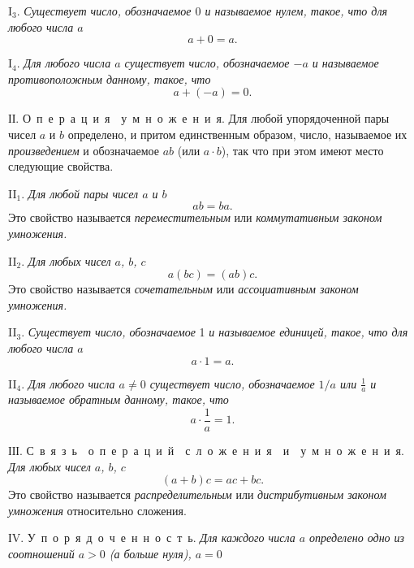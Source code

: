 \documentclass{book}
\begin{document}
\renewcommand{\headrulewidth}{0pt}
{\fontsize{15,8pt}{18pt}\selectfont
I$_{3}$. \textit{Существует число, обозначаемое $0$ и называемое нулем,
такое, что для любого числа $a$}
$$
a + 0 = a.
$$}

{\fontsize{15,8pt}{18pt}\selectfont
I$_{4}$. \textit{Для любого числа $a$ существует число, обозначаемое $-a$ и 
называемое противоположным данному, такое, что}
$$
a + (-a) = 0.
$$}

{\fontsize{15,8pt}{18pt}\selectfont
ІІ. О\ п\ е\ р\ а\ ц\ и\ я\ \ у\ м\ н\ о\ ж\ е\ н\ и\ я. Для любой упорядоченной пары чисел $a$ и $b$
 определено, и притом единственным образом, число, называемое их \textit{произведением} и
обозначаемое
$ab$ (или $a\cdot b$), так что при этом имеют место следующие свойства.}

{\fontsize{15,8pt}{18pt}\selectfont
II$_{1}$. \textit{Для любой пары чисел $a$ и $b$}
$$
ab = ba.
$$
Это свойство называется \textit{переместительным} или \textit{коммутативным законом умножения.}}

{\fontsize{15,8pt}{18pt}\selectfont
II$_{2}$. \textit{Для любых чисел $a$, $b$, $c$}
$$
a(bc) = (ab)c.
$$
Это свойство называется \textit{сочетательным} или \textit{ассоциативным законом умножения.}}

{\fontsize{15,8pt}{18pt}\selectfont
II$_{3}$. \textit{Существует число, обозначаемое} 1 \textit{и называемое единицей, 
такое, что для любого числа $a$}
$$
a\cdot 1 = a.
$$}

{\fontsize{15,8pt}{18pt}\selectfont
II$_{4}$. \textit{Для любого числа $a\ne 0$ существует число, обозначаемое $1/a$ 
или $\frac{1}{a}$ и называемое
обратным данному, такое, что}
$$
a\cdot\frac{1}{a} = 1.
$$}

{\fontsize{15,8pt}{18pt}\selectfont
ІІІ. С\ в\ я\ з\ ь\ \ о\ п\ е\ р\ а\ ц\ и\ й\ \ с\ л\ о\ ж\ е\ н\ и\ я\ \ и\ \ у\ м\ н\ о\ ж\ е\ н\ и\ я. 
\textit{Для любых чисел $a$, $b$, $c$}
$$
(a + b)c = ac + bc.
$$
Это свойство называется \textit{распределительным} или \textit{дистрибутивным 
законом умножения} относительно сложения.}

{\fontsize{15,8pt}{18pt}\selectfont
ІV. У\ п\ о\ р\ я\ д\ о\ ч\ е\ н\ н\ о\ с\ т\ ь. \textit{Для каждого числа $a$ определено 
одно из соотношений
$a > 0$ (а больше нуля), $a = 0$}}

\newpage
{}
\renewcommand{\headrulewidth}{0pt}
\end{document}
